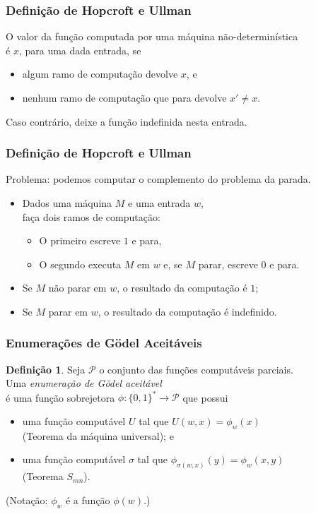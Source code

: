 \documentclass[utf8,notheorems]{beamer}
\theoremstyle{definition}
\newtheorem*{definition}{Definição}
\begin{document}
\begin{frame}
    \frametitle{Definição de Hopcroft e Ullman}
    O valor da função computada por uma máquina não-determinística \\
    é $x$, para uma dada entrada, se
    \begin{itemize}
        \item algum ramo de computação devolve $x$, e
        \item nenhum ramo de computação que para devolve $x' \neq x$.
    \end{itemize}
    Caso contrário, deixe a função indefinida nesta entrada.
    \cite[p.~313]{HopcroftUllman1979}
\end{frame}

\begin{frame}
    \frametitle{Definição de Hopcroft e Ullman}
    Problema: podemos computar o complemento do problema da parada.
    \begin{itemize}
        \item Dados uma máquina $M$ e uma entrada $w$, \\
            faça dois ramos de computação:
            \begin{itemize}
                \item O primeiro escreve $1$ e para,
                \item O segundo executa $M$ em $w$ e, se $M$ parar,
                    escreve $0$ e para.
            \end{itemize}
        \item Se $M$ não parar em $w$,
            o resultado da computação é $1$;
        \item Se $M$ parar em $w$,
            o resultado da computação é indefinido.
    \end{itemize}
\end{frame}

\begin{frame}
    \frametitle{Enumerações de Gödel Aceitáveis}
    \begin{definition}
        Seja $\mathcal P$ o conjunto das funções computáveis parciais. \\
        Uma \emph{enumeração de Gödel aceitável} \\
        é uma função sobrejetora $\phi: \{0, 1\}^* \to \mathcal P$ que possui
        \begin{itemize}
            \item uma função computável $U$ tal que $U(w, x) = \phi_w(x)$ \\
                (Teorema da máquina universal); e
            \item uma função computável $\sigma$ tal que
                    $\phi_{\sigma(w, x)}(y) = \phi_w(x, y)$ \\
                (Teorema $S_{mn}$).
        \end{itemize}
        {\cite[p.~41]{Rogers1987}}

        (Notação: $\phi_w$ é a função $\phi(w)$.)
    \end{definition}
\end{frame}
\end{document}
